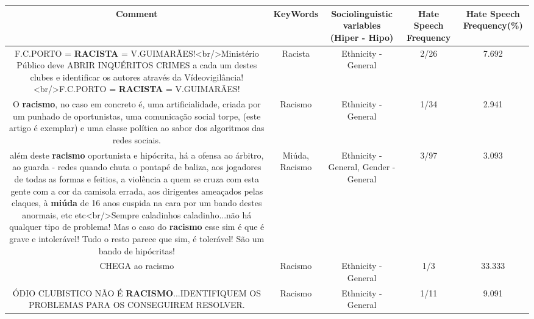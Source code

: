 \documentclass[11pt]{article}
\newlength\mylength
\begin{document}
\begin{center}
\setlength\mylength{\dimexpr\textwidth - 1\arrayrulewidth - 50\tabcolsep}
\begin{longtable}{|C{.65\mylength}|C{.30\mylength}|C{.12\mylength}|C{.12\mylength}|C{.12\mylength}|}
\hline
\textbf{Comment} & \textbf{KeyWords} & \textbf{Sociolinguistic variables (Hiper - Hipo)}  & \textbf{Hate Speech Frequency} & \textbf{Hate Speech Frequency(\%)} \\
\hline{}\small F.C.PORTO = \textbf{RACISTA} = V.GUIMARÃES!<br/>Ministério Público deve ABRIR INQUÉRITOS CRIMES a cada um destes clubes e identificar os autores através da Vídeovigilância!<br/>F.C.PORTO = \textbf{RACISTA} = V.GUIMARÃES!\normalsize   & Racista & Ethnicity - General & 2/26 & 7.692 \\  \hline
  \small O \textbf{racismo}, no caso em concreto é, uma artificialidade, criada por um punhado de oportunistas, uma comunicação social torpe, (este artigo é exemplar) e uma classe política ao sabor dos algoritmos das redes sociais.\normalsize   & Racismo & Ethnicity - General & 1/34 & 2.941 \\  \hline
  \small além deste \textbf{racismo} oportunista e hipócrita, há a ofensa ao árbitro, ao guarda - redes quando chuta o pontapé de baliza, aos jogadores de todas as formas e feitios, a violência a quem se cruza com esta gente com a cor da camisola errada, aos dirigentes ameaçados pelas claques, à \textbf{miúda} de 16 anos cuspida na cara por um bando destes anormais, etc etc<br/>Sempre caladinhos caladinho...não há qualquer tipo de problema! Mas o caso do \textbf{racismo} esse sim é que é grave e intolerável! Tudo o resto parece que sim, é tolerável! São um bando de hipócritas!\normalsize   & Miúda, Racismo & Ethnicity - General, Gender - General & 3/97 & 3.093 \\  \hline
  \small CHEGA ao racismo\normalsize   & Racismo & Ethnicity - General & 1/3 & 33.333 \\  \hline
  \small ÓDIO CLUBISTICO NÃO É \textbf{RACISMO}...IDENTIFIQUEM OS PROBLEMAS PARA OS CONSEGUIREM RESOLVER.\normalsize   & Racismo & Ethnicity - General & 1/11 & 9.091 \\  \hline

\end{longtable}
\end{center}
\end{document}
